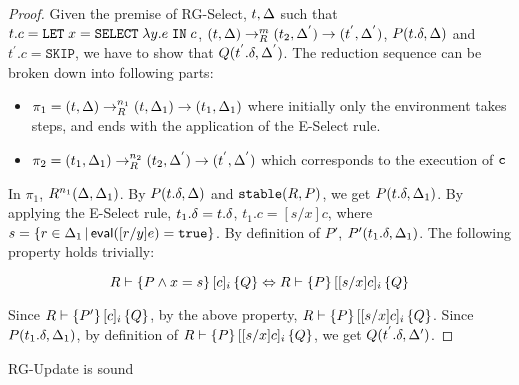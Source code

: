 \documentclass[acmlarge,anonymous]{acmart}\settopmatter{printfolios=true}
\begin{document}
\begin{proof}
Given the premise of RG-Select, $t, \Delta$ such that $t.c = {\tt LET}\;x=\texttt{SELECT}\;\lambda y.e\;{\tt IN}\;c$, $(t, \Delta) \rightarrow_{R}^{m} (t_2, \Delta^{'}) \rightarrow (t^{'}, \Delta^{'})$, $P(t.\delta, \Delta)$ and $t^{'}.c = \texttt{SKIP}$, we have to show that $Q(t^{'}.\delta, \Delta^{'})$. The reduction sequence can be broken down into following parts:

\begin{itemize}
\item $\pi_1 = (t, \Delta) \rightarrow_{R}^{n_1} (t, \Delta_1) \rightarrow (t_1, \Delta_1)$ where initially only the environment takes steps, and ends with the application of the E-Select rule.
\item $\pi_2 = (t_1, \Delta_1) \rightarrow_{R}^{n_2} (t_2, \Delta^{'}) \rightarrow (t^{'}, \Delta^{'}) $ which corresponds to the execution of ${\tt c}$
\end{itemize}

In $\pi_1$, $R^{n_1}(\Delta, \Delta_1)$. By $P(t.\delta, \Delta)$ and $\mathtt{stable}(R, P)$, we get $P(t.\delta, \Delta_1)$. By applying the E-Select rule, $t_1.\delta = t.\delta$, $t_1.c = [s/x]c$, where $s = \{r\in\Delta_1 \,|\, \textsf{eval}([r/y]e)={\tt true}\}$. By definition of $P'$, $P'(t_1.\delta, \Delta_1)$. The following property holds trivially:

$$
R \vdash \{P \wedge x = s\}\,\lbrack c \rbrack_i\,\{Q\} \Leftrightarrow R \vdash \{P\}\,\lbrack [s/x]c \rbrack_i\,\{Q\}
$$

Since $R \vdash \{P'\}\,\lbrack c \rbrack_i\,\{Q\}$, by the above property, $R \vdash \{P\}\,\lbrack [s/x]c \rbrack_i\,\{Q\}$. Since $P(t_1.\delta, \Delta_1)$, by definition of $R \vdash \{P\}\,\lbrack [s/x]c \rbrack_i\,\{Q\}$, we get $Q(t^{'}.\delta, \Delta')$.


\end{proof}

\begin{theorem}
RG-Update is sound
\end{theorem}
\end{document}

